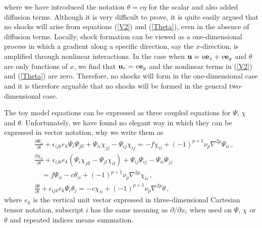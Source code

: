 where we have introduced the notation $ \theta = c \eta $ for the scalar and also added diffusion terms.
Although it is very difficult to prove, it is quite easily argued that no shocks will arise from equations (\ref{V2}) and (\ref{Theta}), even in the absence of diffusion terms.  Locally, shock formation can be viewed as a one-dimensional process in which a gradient along a specific direction, say the $ x $-direction,  is amplified through nonlinear interactions. In the case  when $ {\bf u} = u {\bf e}_x + v {\bf e}_y $  and $ \theta $ are only functions of $ x $, we find that $ {\bf u}_r = v {\bf e}_y $ and the nonlinear terms in (\ref{V2}) and (\ref{Theta}) are zero. Therefore, no shocks will form in the one-dimensional case and it is therefore arguable that no shocks will be formed in the general two-dimensional case.

The toy model equations can be expressed as three coupled equations for $ \Psi $, $ \chi $ and $ \theta $. Unfortunately, we have found no elegant way in which they can be expressed in vector notation, why we write them as
\begin{align} \label{PsiEq}
&\frac{\partial{\Psi_{ii}}}{\partial t} +\epsilon_{ijk}e_k \Psi_i \Psi_{jll} + \Psi_{ii} \chi_{jj} - \Psi_{ij} \chi_{ij} = -f \chi_{ii} + (-1)^{p+1} \nu_p \nabla^{2p} \Psi_{ii} \, , \\ \label{ChiEq}
&\frac{\partial{\chi_{ii}}}{\partial t} +\epsilon_{ijk}e_k (\Psi_i \chi_{jll} -
\Psi_{jl} \chi_{il}) + \Psi_{ij} \Psi_{ij} - \Psi_{ii} \Psi_{jj} \nonumber\\
&\quad=  f \Psi_{ii} - c \theta_{ii} + (-1)^{p+1} \nu_p \nabla^{2p} \chi_{ii} \, , \\ \label{ThetaEq}
&\frac{\partial{\theta}}{\partial t} + \epsilon_{ijk}e_k \Psi_i \theta_{j} = - c \chi_{ii} + (-1)^{p+1} \nu_p \nabla^{2p} \theta \, ,
\end{align}
where $ e_k $ is the vertical unit vector expressed in three-dimensional Cartesian tensor notation,  subscript $ i $  has the same meaning as $ {\partial }/{\partial x_i }$ when used on $ \Psi $,  $ \chi $ or $ \theta $ and repeated indices means summation.


